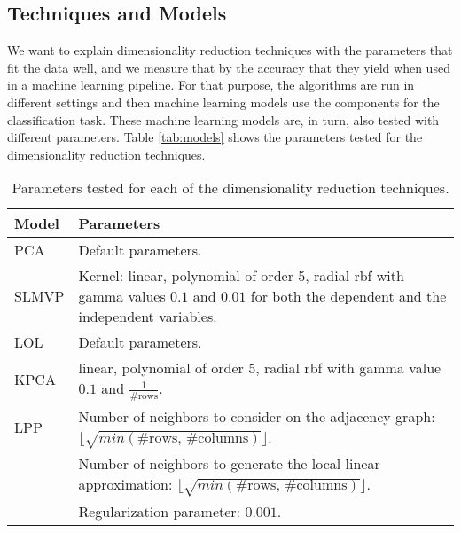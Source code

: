 \subsection{Techniques and Models}
We want to explain dimensionality reduction techniques with the parameters that fit the data well, and we measure that by the accuracy that they yield when used in a machine learning pipeline. For that purpose, the algorithms are run in different settings and then machine learning models use the components for the classification task. These machine learning models are, in turn, also tested with different parameters. Table \ref{tab:models} shows the parameters tested for the dimensionality reduction techniques.

\begin{table}[!ht]
    \centering
    \begin{tabular}{lp{12cm}}
        \toprule
        Model                                                & Parameters                                                                                                                                 \\
        \midrule
        PCA \cite{pca}                                       & Default parameters.                                                                                                                        \\[2mm]
        \rowcolor{lightgray}SLMVP \cite{slmvp}               & Kernel: linear, polynomial of order 5, radial rbf with gamma values $0.1$ and $0.01$ for both the dependent and the independent variables. \\[2mm]
        LOL \cite{lol}                                       & Default parameters.                                                                                                                        \\[2mm]
        \rowcolor{lightgray}KPCA  \cite{kpca}                & linear, polynomial of order 5, radial rbf with gamma value $0.1$ and $\frac{1}{\text{\# rows}}$.                                           \\[2mm]
        LPP \cite{lpp}                                       & Number of neighbors to consider on the adjacency graph: $\lfloor\sqrt{min(\text{\# rows, \# columns})}\rfloor$.                            \\[2mm]
        \rowcolor{lightgray}                                 & Number of neighbors to generate the local linear approximation: $\lfloor\sqrt{min(\text{\# rows, \# columns})}\rfloor$.                    \\[2mm]
        \rowcolor{lightgray}\multirow{-2}{*}{LLE \cite{lle}} & Regularization parameter: $0.001$.                                                                                                         \\
        \bottomrule
    \end{tabular}
    \caption{Parameters tested for each of the dimensionality reduction techniques.}
    \label{tab:techniques}
\end{table}

